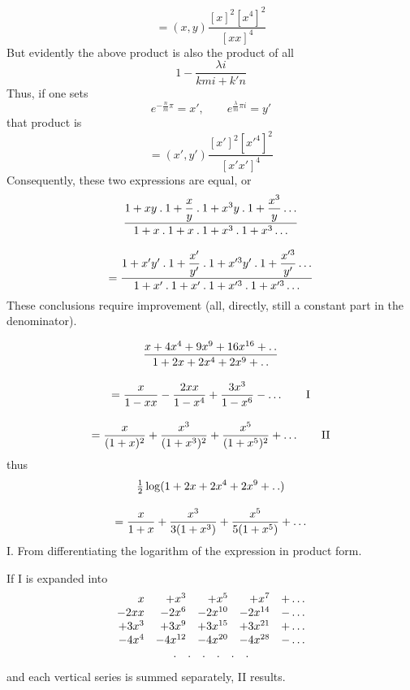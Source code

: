 \[
=(x,y)\frac{[x]^2[x^4]^2}{[xx]^4}
\]
\noindent But evidently the above product is also the product of all
\[
1-\frac{\lambda i}{kmi+k'n}
\]
Thus, if one sets
\[
e^{-\frac nm\pi}=x',\qquad e^{\frac\lambda m\pi i}=y'
\]
that product is
\[
=(x',y')\frac{[x']^2[x'^4]^2}{[x'x']^4}
\]
Consequently, these two expressions are equal, or
\[
\begin{gathered}\frac{1+xy\mathbin{.}1+\dfrac xy\mathbin{.}1+x^3y\mathbin{.}1+\dfrac{x^3}y\mathinner{.\,.\,.}}
 {1+x\mathbin{.}1+x\mathbin{.}1+x^3\mathbin{.}1+x^3\mathinner{.\,.\,.}}\\[9pt]=
\frac{1+x'y'\mathbin{.}1+\dfrac{x'}{y'}\mathbin{.}1+x'^3y'\mathbin{.}1+\dfrac{x'^3}{y'}\mathinner{.\,.\,.}}
 {1+x'\mathbin{.}1+x'\mathbin{.}1+x'^3\mathbin{.}1+x'^3\mathinner{.\,.\,.}}\end{gathered}
\]
These conclusions require improvement (all, directly, still a constant part in the denominator).


\[
\begin{gathered}
\frac{x+4x^4+9x^9+16x^{16}+\mathinner{.\,.}}{1+2x+2x^4+2x^9+\mathinner{.\,.}}
\\[9pt]=\frac{x}{1-xx}-\frac{2xx}{1-x^4}+\frac{3x^3}{1-x^6}-\mathinner{.\,.\,.}
\qquad \mathrm{I}\\[9pt]=\frac{x}{(1+x)^2}+\frac{x^3}{(1+x^3)^2}+\frac{x^5}{(1+x^5)^2}+\mathinner{.\,.\,.}
\qquad \mathrm{II}
\end{gathered}
\]
thus
\[
\begin{gathered}\tfrac12\log(1+2x+2x^4+2x^9+\mathinner{.\,.})\\[9pt]=\frac{x}{1+x}+\frac{x^3}{3(1+x^3)}+\frac{x^5}{5(1+x^5)}+\mathinner{.\,.\,.}\end{gathered}
\]
I. From differentiating the logarithm of the expression in product form.

If I is expanded into
\[
\begin{array}{rrrrl}
x&+x^3&+x^5&+x^7&+\mathinner{.\,.\,.}\\
-2xx&-2x^6&-2x^{10}&-2x^{14}&-\mathinner{.\,.\,.}\\
+3x^3&+3x^9&+3x^{15}&+3x^{21}&+\mathinner{.\,.\,.}\\
-4x^4&-4x^{12}&-4x^{20}&-4x^{28}&-\mathinner{.\,.\,.}\\
\multicolumn{5}{c}{.\quad .\quad .\quad .\quad .\quad .}
\end{array}
\]
and each vertical series is summed separately, II results.


